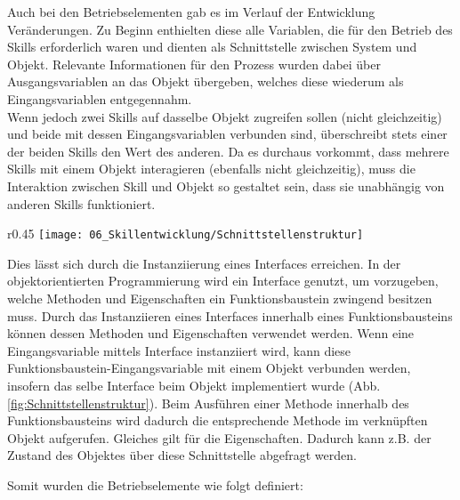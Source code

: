 	 Auch bei den Betriebselementen gab es im Verlauf der Entwicklung Veränderungen. Zu Beginn enthielten diese alle Variablen, die für den Betrieb des Skills erforderlich waren und dienten als Schnittstelle zwischen System und Objekt. Relevante Informationen für den Prozess wurden dabei über Ausgangsvariablen an das Objekt übergeben, welches diese wiederum als Eingangsvariablen entgegennahm.
	 \\
	 Wenn jedoch zwei Skills auf dasselbe Objekt zugreifen sollen (nicht gleichzeitig) und beide mit dessen Eingangsvariablen verbunden sind, überschreibt stets einer der beiden Skills den Wert des anderen. Da es durchaus vorkommt, dass mehrere Skills mit einem Objekt interagieren (ebenfalls nicht gleichzeitig), muss die Interaktion zwischen Skill und Objekt so gestaltet sein, dass sie unabhängig von anderen Skills funktioniert.
	 \\
	 \begin{wrapfigure}{r}{0.45\textwidth}
	 	\centering
	 	\texttt{[image: 06\_Skillentwicklung/Schnittstellenstruktur]}
	 	\captionsetup{justification=centering}
	 	\caption{Schnittstellenstruktur}
	 	\label{fig:Schnittstellenstruktur}
	 \end{wrapfigure} Dies lässt sich durch die Instanziierung eines Interfaces erreichen. In der objektorientierten Programmierung wird ein Interface genutzt, um vorzugeben, welche Methoden und Eigenschaften ein Funktionsbaustein zwingend besitzen muss. Durch das Instanziieren eines Interfaces innerhalb eines Funktionsbausteins können dessen Methoden und Eigenschaften verwendet werden. Wenn eine Eingangsvariable mittels Interface instanziiert wird, kann diese Funktionsbaustein-Eingangsvariable mit einem Objekt verbunden werden, insofern das selbe Interface beim Objekt implementiert wurde (Abb. \ref{fig:Schnittstellenstruktur}). Beim Ausführen einer Methode innerhalb des Funktionsbausteins wird dadurch die entsprechende Methode im verknüpften Objekt aufgerufen. Gleiches gilt für die Eigenschaften. Dadurch kann z.B. der Zustand des Objektes über diese Schnittstelle abgefragt werden. 
	 
	 \newpage
	 
	 Somit wurden die Betriebselemente wie folgt definiert: 
	 
